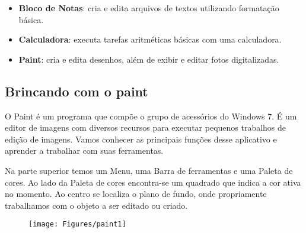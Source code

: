 \documentclass[12pt]{article}
\begin{document}
			
			\begin{itemize}
				\item{
					{\bf Bloco de Notas}: cria e edita arquivos de textos utilizando formatação básica.
					}
				
				\item{
					{\bf Calculadora}: executa tarefas aritméticas básicas com uma calculadora.
					}
					
				\item{
					{\bf Paint}: cria e edita desenhos, além de exibir e editar fotos digitalizadas.
					}
			\end{itemize}
			
			\subsection{Brincando com o paint}
			
			O Paint é um programa que compõe o grupo de acessórios do Windows 7. É um editor de imagens com diversos recursos para executar pequenos trabalhos de edição de imagens. Vamos conhecer as principais funções desse aplicativo e aprender a trabalhar com suas ferramentas.
			
			Na parte superior temos um Menu, uma Barra de ferramentas e uma Paleta de cores. Ao lado da Paleta de cores encontra-se um quadrado que indica a cor ativa no momento. Ao centro se localiza o plano de fundo, onde propriamente trabalhamos com o objeto a ser editado ou criado.
			
			\begin{figure}[!h]
				\centering
				\texttt{[image: Figures/paint1]}
				\label{fig:paint1}
			\end{figure}
		
\end{document}
